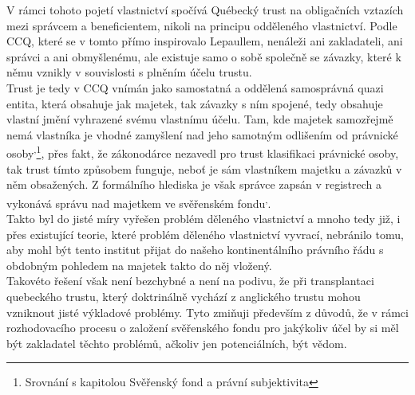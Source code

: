 \documentclass{article}
\begin{document}
V rámci tohoto pojetí vlastnictví spočívá Québecký trust na obligačních vztazích mezi správcem a beneficientem, nikoli na principu odděleného vlastnictví. Podle CCQ, které se v tomto přímo inspirovalo Lepaullem, nenáleži ani zakladateli, ani správci a ani obmyšlenému, ale existuje samo o sobě společně se závazky, které k němu vznikly v souvislosti s plněním účelu trustu.\\

Trust je tedy v CCQ vnímán jako samostatná a oddělená samosprávná quazi entita, která obsahuje jak majetek, tak závazky s ním spojené, tedy obsahuje vlastní jmění vyhrazené svému vlastnímu účelu. Tam, kde majetek samozřejmě nemá vlastníka je vhodné zamyšlení nad jeho samotným odlišením od právnické osoby\textsuperscript{,}\footnote{Srovnání s kapitolou Svěřenský fond a právní subjektivita}, přes fakt, že zákonodárce nezavedl pro trust klasifikaci právnické osoby, tak trust tímto způsobem funguje, neboť je sám vlastníkem majetku a závazků v něm obsažených. Z formálního hlediska je však správce zapsán v registrech a vykonává správu nad majetkem ve svěřenském fondu\textsuperscript{,}.\\

Takto byl do jisté míry vyřešen problém děleného vlastnictví a mnoho tedy již, i přes existující teorie, které problém děleného vlastnictví vyvrací, nebránilo tomu, aby mohl být tento institut přijat do našeho kontinentálního právního řádu s obdobným pohledem na majetek takto do něj vložený.\\

Takovéto řešení však není bezchybné a není na podivu, že při transplantaci quebeckého trustu, který doktrinálně vychází z anglického trustu mohou vzniknout jisté výkladové problémy. Tyto zmiňuji především z důvodů, že v rámci rozhodovacího procesu o založení svěřenského fondu pro jakýkoliv účel by si měl být zakladatel těchto problémů, ačkoliv jen potenciálních, být vědom.\\
\end{document}
